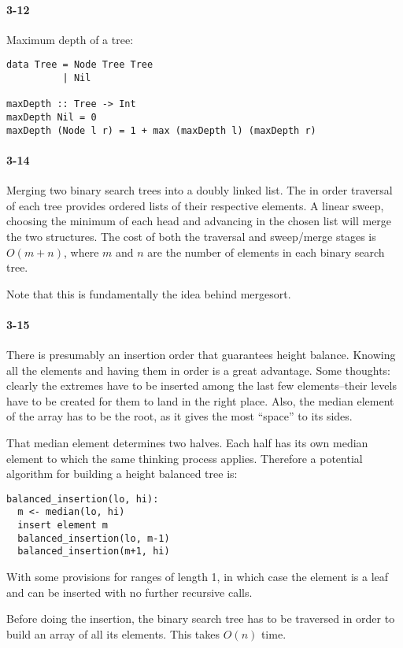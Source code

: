 \documentclass{report}
\begin{document}
\paragraph{3-12} Maximum depth of a tree:
\begin{lstlisting}
data Tree = Node Tree Tree
          | Nil

maxDepth :: Tree -> Int
maxDepth Nil = 0
maxDepth (Node l r) = 1 + max (maxDepth l) (maxDepth r)
\end{lstlisting}

\paragraph{3-14} Merging two binary search trees into a doubly linked list. The in order
traversal of each tree provides ordered lists of their respective elements. A linear
sweep, choosing the minimum of each head and advancing in the chosen list will merge
the two structures. The cost of both the traversal and sweep/merge stages is $O(m+n)$,
where $m$ and $n$ are the number of elements in each binary search tree.

Note that this is fundamentally the idea behind mergesort.

\paragraph{3-15} There is presumably an insertion order that guarantees height balance.
Knowing all the elements and having them in order is a great advantage. Some thoughts:
clearly the extremes have to be inserted among the last few elements--their levels have
to be created for them to land in the right place. Also, the median element of the array
has to be the root, as it gives the most ``space'' to its sides.

That median element determines two halves. Each half has its own median element to which
the same thinking process applies. Therefore a potential algorithm for building a height balanced tree is:
\begin{lstlisting}
balanced_insertion(lo, hi):
  m <- median(lo, hi)
  insert element m
  balanced_insertion(lo, m-1)
  balanced_insertion(m+1, hi)
\end{lstlisting}
With some provisions for ranges of length 1, in which case the element is a leaf and can
be inserted with no further recursive calls.

Before doing the insertion, the binary search tree has to be traversed in order to build
an array of all its elements. This takes $O(n)$ time.
\end{document}
